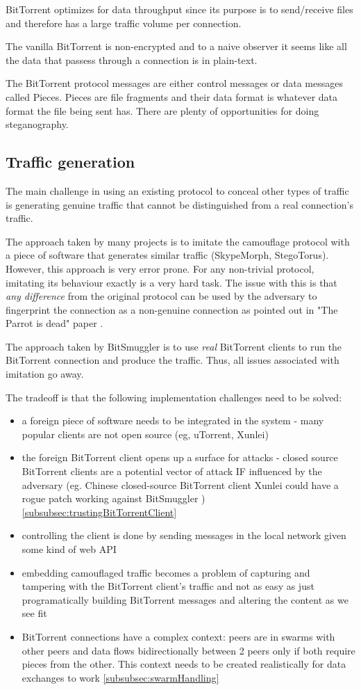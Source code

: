 \documentclass[11pt]{book} %
\newcommand{\projectName}{BitSmuggler }
\begin{document}
BitTorrent optimizes for data throughput since its purpose is to send/receive files and therefore has a large traffic volume per connection.

The vanilla BitTorrent is non-encrypted and to a naive observer it seems like all the data that passess through a connection is in plain-text.

The BitTorrent protocol messages are either control messages or data messages called Pieces. Pieces are file fragments and their data format is whatever data format the file being sent has. There are plenty of opportunities for doing steganography.


\subsection{Traffic generation}

The main challenge in using an existing protocol to conceal other types of traffic is generating genuine traffic that cannot be distinguished from a real connection's traffic.

The approach taken by many projects is to imitate the camouflage protocol with a piece of software that generates similar traffic (SkypeMorph, StegoTorus). However, this approach is very error prone. For any non-trivial protocol, imitating its behaviour exactly is a very hard task. The issue with this is that \textit{any difference} from the original protocol can be used by the adversary to fingerprint the connection as a non-genuine connection as pointed out in "The Parrot is dead" paper  \citep*{deadParrot}.

The approach taken by \projectName is to use \textit{real} BitTorrent clients to run the BitTorrent connection and produce the traffic. Thus, all issues associated with imitation go away.

The tradeoff is that the following implementation challenges need to be solved:
\begin{itemize}
\item a foreign piece of software needs to be integrated in the system - many popular clients are not open source (eg, uTorrent, Xunlei)
\item the foreign BitTorrent client opens up a surface for attacks - closed source BitTorrent clients are a potential vector of attack IF influenced by the adversary (eg. Chinese closed-source BitTorrent client Xunlei could have a rogue patch working against \projectName) \ref{subsubsec:trustingBitTorrentClient}
\item controlling the client is done by sending messages in the local network given some kind of web API
\item embedding camouflaged traffic becomes a problem of capturing and tampering with the BitTorrent client's traffic and not as easy as just programatically building BitTorrent messages and altering the content as we see fit
\item BitTorrent connections have a complex context: peers are in swarms with other peers and data flows bidirectionally between 2 peers only if both require pieces from the other. This context needs to be created realistically for data exchanges to work \ref{subsubsec:swarmHandling}
\end{itemize}
\end{document}
